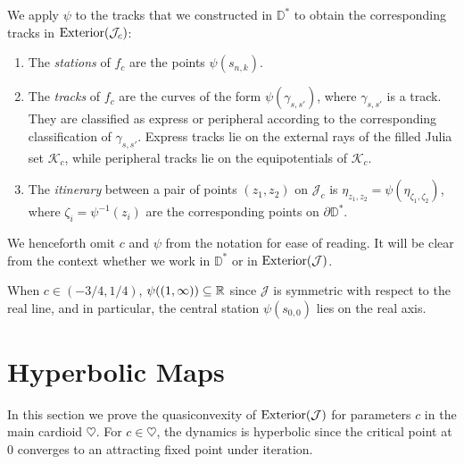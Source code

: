 We apply $\psi$ to the tracks that we constructed in $\mathbb D^*$ 
to obtain the corresponding tracks in $\operatorname{Exterior}(\mathcal{J}_c)$:
\begin{definition} \leavevmode
\begin{enumerate}
	\item The 	\emph{stations} of $f_c$ are the points $\psi(s_{n,k})$.


\item The \emph{tracks} of $f_c$ are the curves of the form $\psi (\gamma_{s,s'})$, where $\gamma_{s,s'}$ is a track. They are classified as express or peripheral according to the corresponding classification of $\gamma_{s,s'}$. 
Express tracks lie on the external rays of the filled Julia set $\mathcal K_c$, while peripheral tracks lie on the equipotentials of $\mathcal K_c$.

\item The \emph{itinerary} between a pair of points $(z_1,z_2)$ on $\mathcal J_c$ is
$\eta_{z_1,z_2}=\psi(\eta_{\zeta_1,\zeta_2})$, 
where $\zeta_i=\psi^{-1}(z_i)$ are the corresponding points on $\partial \mathbb D^*$. 
\end{enumerate}

We henceforth omit $c$ and $\psi$ from the notation for ease of reading. It will be clear from the context whether we work in $\mathbb D^*$ or in $\operatorname{Exterior}(\mathcal J)$.

\end{definition}

When $c \in (-3/4, 1/4)$, $\psi ((1,\infty))\subseteq\mathbb{R}$ since $\mathcal{J}$ is symmetric with respect to the real line, and in particular, the central station $\psi(s_{0,0})$ lies on the real axis.


\section{Hyperbolic Maps}
In this section we prove the quasiconvexity of $\operatorname{Exterior}(\mathcal J)$ for parameters $c$ in the main cardioid $\heartsuit$. For $c \in \heartsuit$, the dynamics is hyperbolic since the critical point at 0 converges to an attracting fixed point under iteration.


